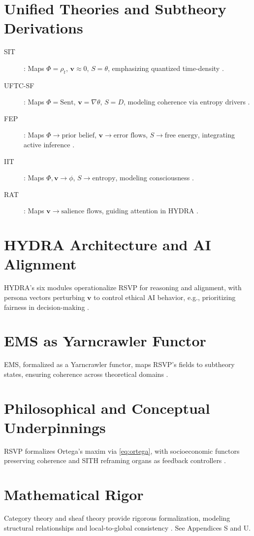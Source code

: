 \documentclass[12pt]{report}
\newcommand{\PhiRSVP}{\Phi}
\newcommand{\vRSVP}{\mathbf{v}}
\newcommand{\SRSVP}{S}
\begin{document}
\section{Unified Theories and Subtheory Derivations}
\begin{description}
    \item[SIT]: Maps \(\PhiRSVP = \rho_t\), \(\vRSVP \approx 0\), \(\SRSVP = \theta\), emphasizing quantized time-density \citep{Blumberg2025}.
    \item[UFTC-SF]: Maps \(\PhiRSVP = \text{Sent}\), \(\vRSVP = \nabla\theta\), \(\SRSVP = D\), modeling coherence via entropy drivers \citep{Logan2025}.
    \item[FEP]: Maps \(\PhiRSVP \to \text{prior belief}\), \(\vRSVP \to \text{error flows}\), \(\SRSVP \to \text{free energy}\), integrating active inference \citep{Friston2010}.
    \item[IIT]: Maps \(\PhiRSVP, \vRSVP \to \phi\), \(\SRSVP \to \text{entropy}\), modeling consciousness \citep{Tononi2016}.
    \item[RAT]: Maps \(\vRSVP \to \text{salience flows}\), guiding attention in HYDRA \citep{RAT2025}.
\end{description}

\section{HYDRA Architecture and AI Alignment}
HYDRA’s six modules operationalize RSVP for reasoning and alignment, with persona vectors perturbing \(\vRSVP\) to control ethical AI behavior, e.g., prioritizing fairness in decision-making \citep{HYDRA2025, Chen2025}.

\section{EMS as Yarncrawler Functor}
EMS, formalized as a Yarncrawler functor, maps RSVP’s fields to subtheory states, ensuring coherence across theoretical domains \citep{SocioeconomicFunctors2025}.

\section{Philosophical and Conceptual Underpinnings}
RSVP formalizes Ortega’s maxim via \eqref{eq:ortega}, with socioeconomic functors preserving coherence and SITH reframing organs as feedback controllers \citep{SocioeconomicFunctors2025}.

\section{Mathematical Rigor}
Category theory and sheaf theory provide rigorous formalization, modeling structural relationships and local-to-global consistency \citep{Lurie2009, Bredon1997}. See Appendices S and U.
\end{document}
